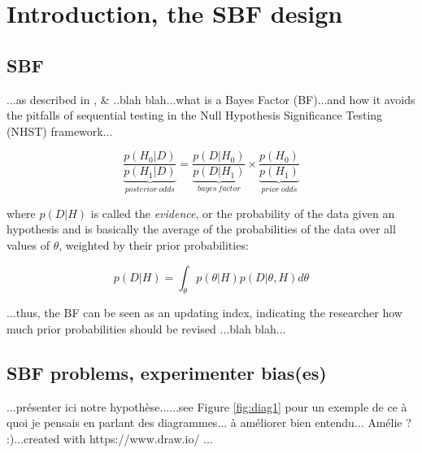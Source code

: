 \documentclass[a4paper,man,natbib,floatsintext]{apa6}
\begin{document}

\newpage

\section{Introduction, the SBF design}

\subsection{SBF}

...as described in \cite{schonbrodt_bayes_2017}, \& \cite{schonbrodt_sequential_2017}..blah blah...what is a Bayes Factor (BF)...and how it avoids the pitfalls of sequential testing  in the Null Hypothesis Significance Testing (NHST) framework...

\begin{equation}
\underbrace{\dfrac{p(H_{0}|D)}{p(H_{1}|D)}}_{posterior\ odds} = \underbrace{\dfrac{p(D|H_{0})}{p(D|H_{1})}}_{bayes\ factor} \times \underbrace{\dfrac{p(H_{0})}{p(H_{1})}}_{prior\ odds}
\end{equation}

\vspace{5mm}

where $p(D|H)$ is called the \emph{evidence}, or the probability of the data given an hypothesis and is basically the average of the probabilities of the data over all values of $\theta$, weighted by their prior probabilities:

\begin{equation}
p(D|H) = \int_{\theta} p(\theta|H) p(D|\theta,H) d\theta
\end{equation}

\vspace{5mm}

...thus, the BF can be seen as an updating index, indicating the researcher how much prior probabilities should be revised \cite[e.g.,][]{kruschke_bayesian_2017-1}...blah blah...

\subsection{SBF problems, experimenter bias(es)}

...présenter ici notre hypothèse......see Figure \ref{fig:diag1} pour un exemple de ce à quoi je pensais en parlant des diagrammes... à améliorer bien entendu... Amélie ? :)...created with https://www.draw.io/ ...
\end{document}
